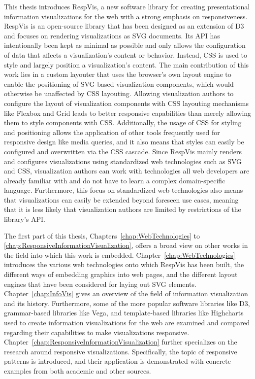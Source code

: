 This thesis introduces RespVis, a new software library for creating
presentational information visualizations for the web with a strong
emphasis on responsiveness.  RespVis is an open-source library
\parencite{RespVisGitHub} that has been designed as an extension of D3
and focuses on rendering visualizations as SVG documents.  Its API has
intentionally been kept as minimal as possible and only allows the
configuration of data that affects a visualization's content or
behavior.  Instead, CSS is used to style and largely position a
visualization's content.  The main contribution of this work lies in a
custom layouter that uses the browser's own layout engine to enable
the positioning of SVG-based visualization components, which would
otherwise be unaffected by CSS layouting.  Allowing visualization
authors to configure the layout of visualization components with CSS
layouting mechanisms like Flexbox and Grid leads to better responsive
capabilities than merely allowing them to style components with CSS.
Additionally, the usage of CSS for styling and positioning allows the
application of other tools frequently used for responsive design like
media queries, and it also means that styles can easily be configured
and overwritten via the CSS cascade.  Since RespVis mainly renders and
configures visualizations using standardized web technologies such as
SVG and CSS, visualization authors can work with technologies all web
developers are already familiar with and do not have to learn a
complex domain-specific language.  Furthermore, this focus on
standardized web technologies also means that visualizations can
easily be extended beyond foreseen use cases, meaning that it is less
likely that visualization authors are limited by restrictions of the
library's API.

The first part of this thesis, Chapters~\ref{chap:WebTechnologies} to
\ref{chap:ResponsiveInformationVisualization}, offers a broad view on
other works in the field into which this work is
embedded. Chapter~\ref{chap:WebTechnologies} introduces the various
web technologies onto which RespVis has been built, the different ways
of embedding graphics into web pages, and the different layout engines
that have been considered for laying out SVG elements.
Chapter~\ref{chap:InfoVis} gives an overview of the field of
information visualization and its history.  Furthermore, some of the
more popular software libraries like D3, grammar-based libraries like
Vega, and template-based libraries like Highcharts used to create
information visualizations for the web are examined and compared
regarding their capabilities to make visualizations responsive.
Chapter~\ref{chap:ResponsiveInformationVisualization} further
specializes on the research around responsive visualizations.
Specifically, the topic of responsive patterns is introduced, and
their application is demonstrated with concrete examples from both
academic and other sources.

